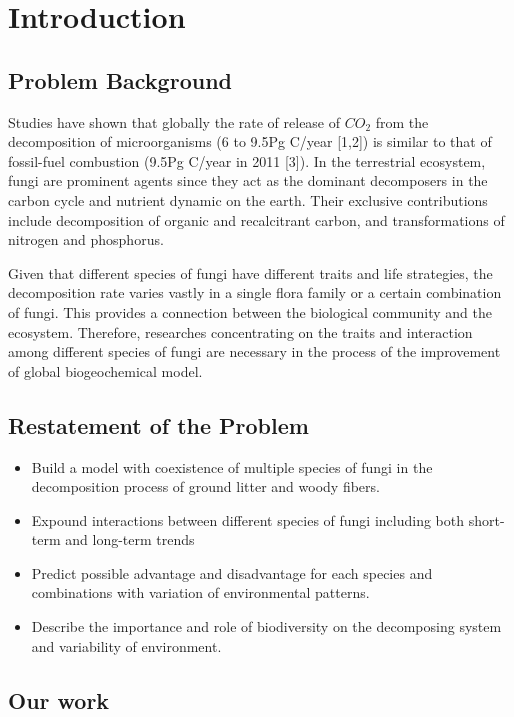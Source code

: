 \documentclass[12pt]{article}
\begin{document}
\clearpage
\pagestyle{fancy}
\tableofcontents 
\newpage



\section{Introduction}
\subsection{Problem Background}
Studies have shown that globally the rate of release of $CO_{2}$ from the decomposition of microorganisms (6 to 9.5Pg C/year [1,2]) is similar to that of fossil-fuel combustion (9.5Pg C/year in 2011 [3]). In the terrestrial ecosystem, fungi are prominent agents since they act as the dominant decomposers in the carbon cycle and nutrient dynamic on the earth. Their exclusive contributions include decomposition of organic and recalcitrant carbon, and transformations of nitrogen and phosphorus. 

Given that different species of fungi have different traits and life strategies, the decomposition rate varies vastly in a single flora family or a certain combination of fungi. This provides a connection between the biological community and the ecosystem. Therefore, researches concentrating on the traits and interaction among different species of fungi are necessary in the process of the improvement of global biogeochemical model.
\subsection{Restatement of the Problem}
\begin{itemize}
	\item Build a model with coexistence of multiple species of fungi in the decomposition process of ground litter and woody fibers.
	\item Expound interactions between different species of fungi including both short-term and long-term trends
	\item Predict possible advantage and disadvantage for each species and combinations with variation of  environmental patterns.
	\item Describe the importance and role of biodiversity on the decomposing system and variability of environment.
\end{itemize}
\subsection{Our work}
\end{document}
